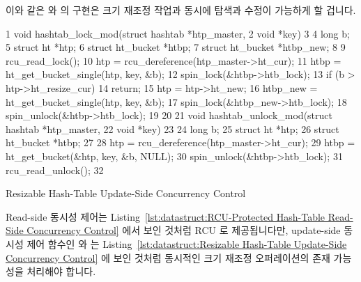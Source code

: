 이와 같은  와  의 구현은 크기
재조정 작업과 동시에 탐색과 수정이 가능하게 할 겁니다.

\begin{listing}[tb]
{ \scriptsize
\begin{verbbox}
 1 void hashtab_lock_mod(struct hashtab *htp_master,
 2                       void *key)
 3 {
 4   long b;
 5   struct ht *htp;
 6   struct ht_bucket *htbp;
 7   struct ht_bucket *htbp_new;
 8 
 9   rcu_read_lock();
10   htp = rcu_dereference(htp_master->ht_cur);
11   htbp = ht_get_bucket_single(htp, key, &b);
12   spin_lock(&htbp->htb_lock);
13   if (b > htp->ht_resize_cur)
14     return;
15   htp = htp->ht_new;
16   htbp_new = ht_get_bucket_single(htp, key, &b);
17   spin_lock(&htbp_new->htb_lock);
18   spin_unlock(&htbp->htb_lock);
19 }
20 
21 void hashtab_unlock_mod(struct hashtab *htp_master,
22                         void *key)
23 {
24   long b;
25   struct ht *htp;
26   struct ht_bucket *htbp;
27 
28   htp = rcu_dereference(htp_master->ht_cur);
29   htbp = ht_get_bucket(&htp, key, &b, NULL);
30   spin_unlock(&htbp->htb_lock);
31   rcu_read_unlock();
32 }
\end{verbbox}
}
\centering
\theverbbox
\caption{Resizable Hash-Table Update-Side Concurrency Control}
\label{lst:datastruct:Resizable Hash-Table Update-Side Concurrency Control}
\end{listing}

Read-side 동시성 제어는
Listing~\ref{lst:datastruct:RCU-Protected Hash-Table Read-Side Concurrency Control}
에서 보인 것처럼 RCU 로 제공됩니다만, update-side 동시성 제어 함수인
 와  는
Listing~\ref{lst:datastruct:Resizable Hash-Table Update-Side Concurrency Control}
에 보인 것처럼 동시적인 크기 재조정 오퍼레이션의 존재 가능성을 처리해야 합니다.

